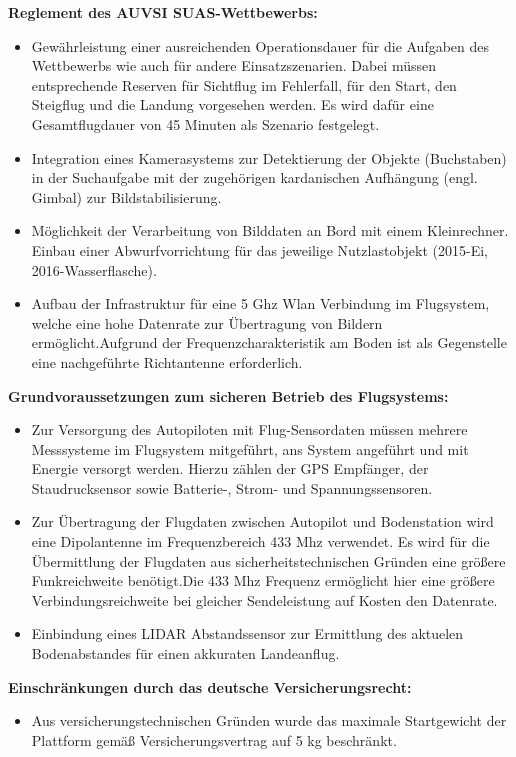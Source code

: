 \textbf{Reglement des AUVSI SUAS-Wettbewerbs:}
\begin{itemize}
\item Gewährleistung einer ausreichenden Operationsdauer für die Aufgaben des Wettbewerbs wie auch für andere Einsatzszenarien. Dabei müssen entsprechende Reserven für Sichtflug im Fehlerfall, für den Start, den Steigflug und die Landung vorgesehen werden. Es wird dafür eine Gesamtflugdauer von 45 Minuten als Szenario festgelegt.
\item Integration eines Kamerasystems zur Detektierung der Objekte (Buchstaben) in der Suchaufgabe mit der zugehörigen kardanischen Aufhängung (engl. Gimbal) zur Bildstabilisierung.
\item Möglichkeit der Verarbeitung von Bilddaten an Bord mit einem Kleinrechner.
Einbau einer Abwurfvorrichtung für das jeweilige Nutzlastobjekt (2015-Ei, 2016-Wasserflasche).
\item Aufbau der Infrastruktur für eine 5 Ghz Wlan Verbindung im Flugsystem, welche eine hohe Datenrate zur Übertragung von Bildern ermöglicht.Aufgrund der Frequenzcharakteristik am Boden ist als Gegenstelle eine nachgeführte Richtantenne erforderlich.
\end{itemize}

\clearpage

\textbf{Grundvoraussetzungen zum sicheren Betrieb des Flugsystems:}
\begin{itemize}
\item Zur Versorgung des Autopiloten mit Flug-Sensordaten müssen mehrere Messsysteme im Flugsystem mitgeführt, ans System angeführt und mit Energie versorgt werden. Hierzu zählen der GPS Empfänger, der Staudrucksensor sowie Batterie-, Strom- und Spannungssensoren.
\item Zur Übertragung der Flugdaten  zwischen Autopilot und Bodenstation wird eine Dipolantenne im Frequenzbereich 433 Mhz verwendet. Es wird für die Übermittlung der Flugdaten aus sicherheitstechnischen Gründen eine größere Funkreichweite benötigt.Die 433 Mhz Frequenz ermöglicht hier eine größere Verbindungsreichweite bei gleicher Sendeleistung auf Kosten den Datenrate.
\item Einbindung eines LIDAR Abstandssensor zur Ermittlung des aktuelen Bodenabstandes für einen akkuraten Landeanflug.
\end{itemize}

\textbf{Einschränkungen durch das deutsche Versicherungsrecht:}
\begin{itemize}
\item Aus versicherungstechnischen Gründen wurde das maximale Startgewicht der Plattform gemäß Versicherungsvertrag auf 5 kg beschränkt.
\end{itemize}

